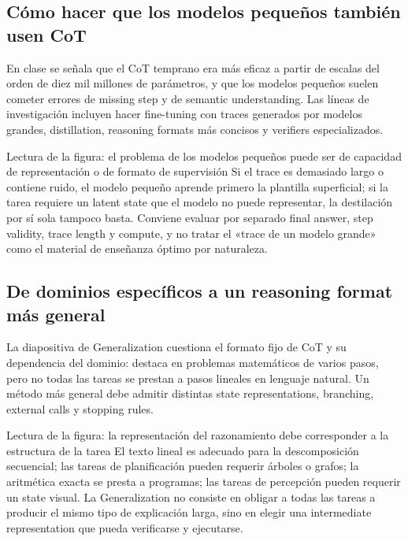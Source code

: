 \subsection{Cómo hacer que los modelos pequeños también usen CoT}

En clase se señala que el CoT temprano era más eficaz a partir de escalas del orden de diez mil millones de parámetros, y que los modelos pequeños suelen cometer errores de missing step y de semantic understanding. Las líneas de investigación incluyen hacer fine-tuning con traces generados por modelos grandes, distillation, reasoning formats más concisos y verifiers especializados.


\begin{knowledgebox}{Lectura de la figura: el problema de los modelos pequeños puede ser de capacidad de representación o de formato de supervisión}
Si el trace es demasiado largo o contiene ruido, el modelo pequeño aprende primero la plantilla superficial; si la tarea requiere un latent state que el modelo no puede representar, la destilación por sí sola tampoco basta. Conviene evaluar por separado final answer, step validity, trace length y compute, y no tratar el «trace de un modelo grande» como el material de enseñanza óptimo por naturaleza.
\end{knowledgebox}

\subsection{De dominios específicos a un reasoning format más general}

La diapositiva de Generalization cuestiona el formato fijo de CoT y su dependencia del dominio: destaca en problemas matemáticos de varios pasos, pero no todas las tareas se prestan a pasos lineales en lenguaje natural. Un método más general debe admitir distintas state representations, branching, external calls y stopping rules.


\begin{knowledgebox}{Lectura de la figura: la representación del razonamiento debe corresponder a la estructura de la tarea}
El texto lineal es adecuado para la descomposición secuencial; las tareas de planificación pueden requerir árboles o grafos; la aritmética exacta se presta a programas; las tareas de percepción pueden requerir un state visual. La Generalization no consiste en obligar a todas las tareas a producir el mismo tipo de explicación larga, sino en elegir una intermediate representation que pueda verificarse y ejecutarse.
\end{knowledgebox}

